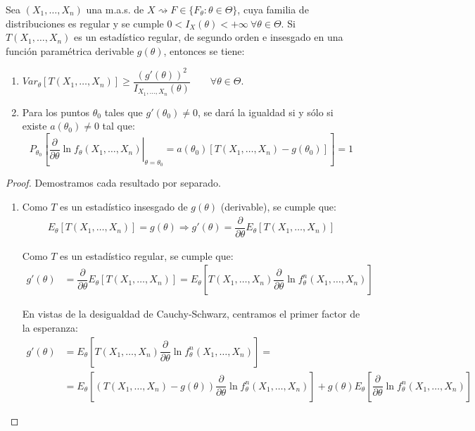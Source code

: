 \begin{teo}
    Sea $(X_1, \ldots, X_n)$ una m.a.s. de $X \rightsquigarrow F \in \{F_\theta : \theta \in \Theta\}$, cuya familia de distribuciones es regular y se cumple $0 < I_X(\theta) < +\infty\ \forall \theta \in \Theta$. Si $T(X_1, \ldots, X_n)$ es un estadístico regular, de segundo orden e insesgado en una función paramétrica derivable $g(\theta)$, entonces se tiene:
    \begin{enumerate}
        \item $Var_\theta[T(X_1, \ldots, X_n)] \geq \dfrac{(g'(\theta))^2}{I_{X_1, \ldots, X_n}(\theta)}\qquad \forall \theta \in \Theta$.
        \item Para los puntos $\theta_0$ tales que $g'(\theta_0) \neq 0$, se dará la igualdad si y sólo si existe $a(\theta_0) \neq 0$ tal que:
        \begin{equation*}
            P_{\theta_0}\left[\left.\dfrac{\partial}{\partial\theta} \ln f_\theta(X_1, \ldots, X_n)\right|_{\theta = \theta_0} = a(\theta_0) [T(X_1, \ldots, X_n) - g(\theta_0)]\right] = 1
        \end{equation*}
    \end{enumerate}
    \begin{proof}
        Demostramos cada resultado por separado.
        \begin{enumerate}
            \item Como $T$ es un estadístico insesgado de $g(\theta)$ (derivable), se cumple que:
            \begin{align*}
                E_\theta[T(X_1, \ldots, X_n)] = g(\theta)
                \Longrightarrow
                g'(\theta) = \dfrac{\partial}{\partial\theta} E_\theta[T(X_1, \ldots, X_n)]
            \end{align*}

            Como $T$ es un estadístico regular, se cumple que:
            \begin{align*}
                g'(\theta) &= \dfrac{\partial}{\partial\theta} E_\theta[T(X_1, \ldots, X_n)]
                = E_\theta\left[T(X_1, \ldots, X_n) \dfrac{\partial}{\partial\theta} \ln f^n_\theta(X_1, \ldots, X_n)\right]
            \end{align*}

            En vistas de la desigualdad de Cauchy-Schwarz, centramos el primer factor de la esperanza:
            \begin{align*}
                g'(\theta) &= E_\theta\left[T(X_1, \ldots, X_n) \dfrac{\partial}{\partial\theta} \ln f^n_\theta(X_1, \ldots, X_n)\right] =\\&= E_\theta\left[(T(X_1, \ldots, X_n) - g(\theta)) \dfrac{\partial}{\partial\theta} \ln f^n_\theta(X_1, \ldots, X_n)\right] + g(\theta) E_\theta\left[\dfrac{\partial}{\partial\theta} \ln f^n_\theta(X_1, \ldots, X_n)\right]
            \end{align*}


\end{enumerate}
\end{proof}
\end{teo}
